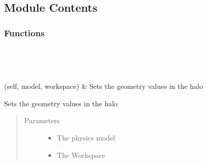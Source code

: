 \documentclass[letterpaper,10pt,english]{sphinxmanual}
\begin{document}
\subsection{Module Contents}
\label{\detokenize{autoapi/bc_metric/index:module-contents}}

\subsubsection{Functions}
\label{\detokenize{autoapi/bc_metric/index:functions}}

\begin{savenotes}\sphinxatlongtablestart\begin{longtable}[c]{}
\hline

\endfirsthead

%
{}\\
\hline

\endhead

\hline
{}\\
\endfoot

\endlastfoot

\sphinxAtStartPar
{\hyperref[\detokenize{autoapi/bc_metric/index:bc_metric.halo_geom}]{}}(self, model, workspace)
&
\sphinxAtStartPar
Sets the geometry values in the halo
\\
\hline
\end{longtable}\sphinxatlongtableend\end{savenotes}

\begin{fulllineitems}
\label{\detokenize{autoapi/bc_metric/index:bc_metric.halo_geom}}
\sphinxAtStartPar
Sets the geometry values in the halo
\begin{quote}\begin{description}
\item[{Parameters}] \leavevmode\begin{itemize}
\item {} 
\sphinxAtStartPar
{} \textendash{} The physics model

\item {} 
\sphinxAtStartPar
{} \textendash{} The Workspace

\end{itemize}

\end{description}\end{quote}

\end{fulllineitems}
\end{document}
